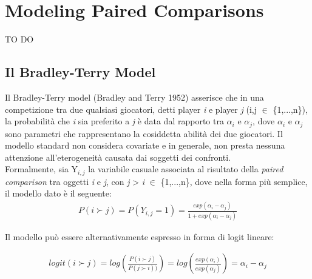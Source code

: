 \chapter{Modeling Paired Comparisons}

TO DO

\section{Il Bradley-Terry Model}
Il Bradley-Terry model \autocite{bradley1952rank}(Bradley and Terry 1952) asserisce che in una competizione tra due qualsiasi giocatori, detti player \textit{i} e player \textit{j} (i,j $\in$ \{1,...,n\}), la probabilità che \textit{i} sia preferito a \textit{j} è data dal rapporto tra $\alpha_{i}$ e $\alpha_{j}$, dove $\alpha_{i}$ e $\alpha_{j}$ sono parametri che rappresentano la cosiddetta abilità dei due giocatori. Il modello standard non considera covariate e in generale, non presta nessuna attenzione all'eterogeneità causata dai soggetti dei confronti.\\

Formalmente, sia Y$_{i,j}$ la variabile casuale associata al risultato della \emph{paired comparison} tra oggetti \textit{i} e \textit{j}, con \textit{j} > \textit{i} $\in$ \{1,...,n\}, dove nella forma più semplice, il modello dato è il seguente:
\begin{align} 
	P(i\succ j) = P(Y_{i,j} = 1) = \frac{exp(\alpha_{i} - \alpha_{j})}{1 + exp(\alpha_{i} - \alpha_{j})} \label{for:3.1} 
\end{align}

Il modello può essere alternativamente espresso in forma di logit lineare:

\begin{align}
		logit(i \succ j) =  log( \frac{P( i \succ j)}{P( j \succ i))} ) = log(\frac{exp(\alpha_{i})}{exp(\alpha_{j})}) = \alpha_i - \alpha_j 
	\end{align}

